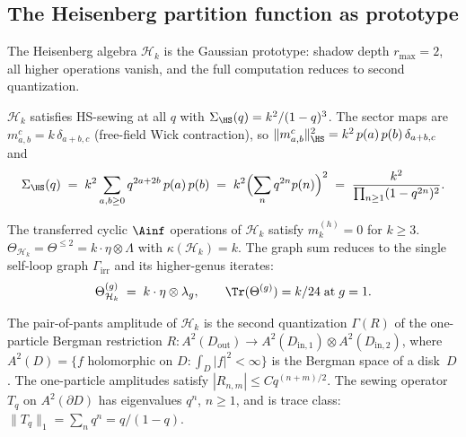 \subsection{The Heisenberg partition function as prototype}
\label{subsec:thqg-I-heisenberg-prototype}

The Heisenberg algebra $\mathcal{H}_k$ is the Gaussian
prototype: shadow depth $r_{\max} = 2$, all higher operations
vanish, and the full computation reduces to second quantization.

\begin{proposition}%
\label{prop:g1-heisenberg-hs}%
%
$\mathcal{H}_k$ satisfies HS-sewing at all $q$ with
$\Sigma_{\HS}(q) = k^2/(1-q)^3$.  The sector maps are
$m_{a,b}^c = k\,\delta_{a+b,c}$ (free-field Wick contraction),
so $\|m_{a,b}^c\|_{\HS}^2 = k^2\,p(a)\,p(b)\,\delta_{a+b,c}$
and
\begin{equation}\label{eq:g1-heisenberg-hs}
\Sigma_{\HS}(q)
\;=\;
k^2 \sum_{a,b \geq 0} q^{2a+2b}\,p(a)\,p(b)
\;=\;
k^2 \Bigl(\sum_n q^{2n} p(n)\Bigr)^2
\;=\;
\frac{k^2}{\prod_{n \geq 1}(1-q^{2n})^2}.
\end{equation}
\end{proposition}

\begin{proposition}%
\label{prop:g1-heisenberg-terminates}%
%
The transferred cyclic $\Ainf$ operations of $\mathcal{H}_k$
satisfy $m_k^{(h)} = 0$ for $k \geq 3$.
$\Theta_{\mathcal{H}_k} = \Theta^{\leq 2} =
k \cdot \eta \otimes \Lambda$
with $\kappa(\mathcal{H}_k) = k$.  The graph sum reduces to
the single self-loop graph $\Gamma_{\mathrm{irr}}$ and its
higher-genus iterates:
\begin{equation}\label{eq:g1-heisenberg-theta}
\Theta_{\mathcal{H}_k}^{(g)}
\;=\;
k \cdot \eta \otimes \lambda_g,
\qquad
\Tr(\Theta^{(g)}) = k/24 \;\text{at}\; g = 1.
\end{equation}
\end{proposition}

\begin{theorem}%
\label{thm:g1-heisenberg-sewing}%
%
%
The pair-of-pants amplitude of $\mathcal{H}_k$ is the
second quantization $\Gamma(R)$ of the one-particle Bergman
restriction $R \colon A^2(D_{\mathrm{out}}) \to
A^2(D_{\mathrm{in},1}) \otimes A^2(D_{\mathrm{in},2})$,
where $A^2(D) = \{f \text{ holomorphic on } D :
\int_D |f|^2 < \infty\}$ is the Bergman space of a disk~$D$.
The one-particle amplitudes satisfy
$|R_{n,m}| \leq Cq^{(n+m)/2}$.  The sewing operator $T_q$ on
$A^2(\partial D)$ has eigenvalues $q^n$, $n \geq 1$, and is
trace class: $\|T_q\|_1 = \sum_n q^n = q/(1-q)$.
\end{theorem}

